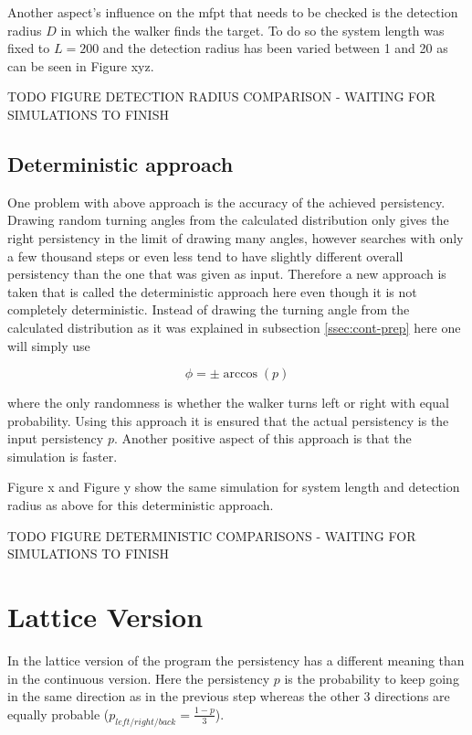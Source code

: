 \documentclass[]{scrartcl}
\begin{document}
Another aspect's influence on the mfpt that needs to be checked is the detection radius $D$ in which the walker finds the target. To do so the system length was fixed to $L = 200$ and the detection radius has been varied between 1 and 20 as can be seen in Figure xyz.

TODO FIGURE DETECTION RADIUS COMPARISON - WAITING FOR SIMULATIONS TO FINISH

\subsection{Deterministic approach}
\label{ssec:cont-deter}

One problem with above approach is the accuracy of the achieved persistency. Drawing random turning angles from the calculated distribution only gives the right persistency in the limit of drawing many angles, however searches with only a few thousand steps or even less tend to have slightly different overall persistency than the one that was given as input. Therefore a new approach is taken that is called the deterministic approach here even though it is not completely deterministic. Instead of drawing the turning angle from the calculated distribution as it was explained in subsection \ref{ssec:cont-prep} here one will simply use

\begin{equation}
 \label{eq:cont-deter-angle}
 \phi = \pm \arccos\left(p\right)
\end{equation}

where the only randomness is whether the walker turns left or right with equal probability. Using this approach it is ensured that the actual persistency is the input persistency $p$. Another positive aspect of this approach is that the simulation is faster.

Figure x and Figure y show the same simulation for system length and detection radius as above for this deterministic approach.

TODO FIGURE DETERMINISTIC COMPARISONS - WAITING FOR SIMULATIONS TO FINISH

\newpage

\section{Lattice Version}
\label{sec:latt}
In the lattice version of the program the persistency has a different meaning than in the continuous version. Here the persistency $p$ is the probability to keep going in the same direction as in the previous step whereas the other 3 directions are equally probable ($p_{left/right/back} = \frac{1 - p}{3}$).
\end{document}
